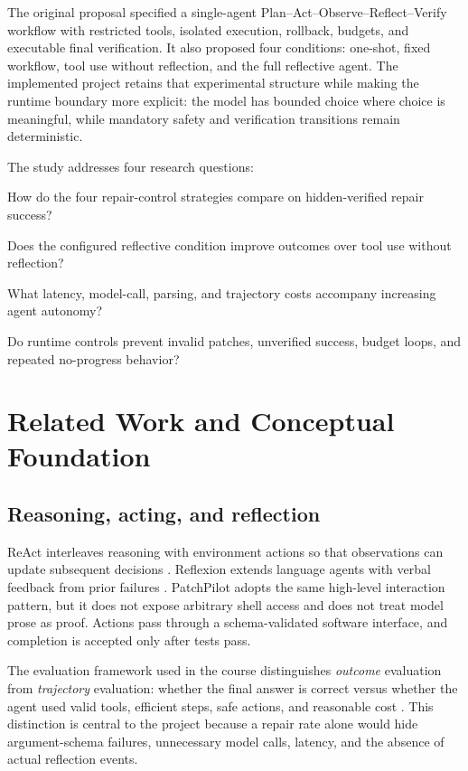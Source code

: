 \documentclass[11pt,a4paper]{article}
\begin{document}
The original proposal specified a single-agent
Plan--Act--Observe--Reflect--Verify workflow with restricted tools, isolated
execution, rollback, budgets, and executable final verification. It also
proposed four conditions: one-shot, fixed workflow, tool use without reflection,
and the full reflective agent. The implemented project retains that experimental
structure while making the runtime boundary more explicit: the model has bounded
choice where choice is meaningful, while mandatory safety and verification
transitions remain deterministic.

The study addresses four research questions:

\begin{description}[leftmargin=0pt,labelindent=0pt]
  \item[RQ1.] How do the four repair-control strategies compare on
  hidden-verified repair success?
  \item[RQ2.] Does the configured reflective condition improve outcomes over
  tool use without reflection?
  \item[RQ3.] What latency, model-call, parsing, and trajectory costs accompany
  increasing agent autonomy?
  \item[RQ4.] Do runtime controls prevent invalid patches, unverified success,
  budget loops, and repeated no-progress behavior?
\end{description}

\clearpage
\section{Related Work and Conceptual Foundation}

\subsection{Reasoning, acting, and reflection}

ReAct interleaves reasoning with environment actions so that observations can
update subsequent decisions \cite{react}. Reflexion extends language agents
with verbal feedback from prior failures \cite{reflexion}. PatchPilot adopts
the same high-level interaction pattern, but it does not expose arbitrary shell
access and does not treat model prose as proof. Actions pass through a
schema-validated software interface, and completion is accepted only after tests
pass.

The evaluation framework used in the course distinguishes \emph{outcome} evaluation from
\emph{trajectory} evaluation: whether the final answer is correct versus
whether the agent used valid tools, efficient steps, safe actions, and reasonable
cost \cite{courseeval}. This distinction is central to the project because a
repair rate alone would hide argument-schema failures, unnecessary model calls,
latency, and the absence of actual reflection events.
\end{document}
